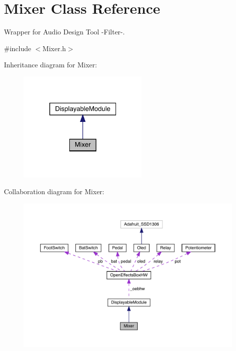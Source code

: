 \hypertarget{class_mixer}{}\section{Mixer Class Reference}
\label{class_mixer}


Wrapper for Audio Design Tool -\/\+Filter-\/.  




{\ttfamily \#include $<$Mixer.\+h$>$}



Inheritance diagram for Mixer\+:
\nopagebreak
\begin{figure}[H]
\begin{center}
\leavevmode
\includegraphics[width=180pt]{class_mixer__inherit__graph}
\end{center}
\end{figure}


Collaboration diagram for Mixer\+:
\nopagebreak
\begin{figure}[H]
\begin{center}
\leavevmode
\includegraphics[width=350pt]{class_mixer__coll__graph}
\end{center}
\end{figure}
